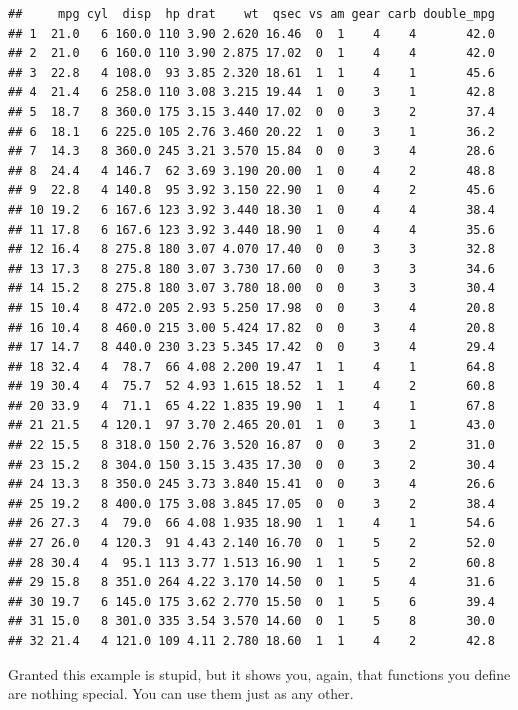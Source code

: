 \documentclass[]{gitbook}
\begin{document}
\begin{verbatim}
##     mpg cyl  disp  hp drat    wt  qsec vs am gear carb double_mpg
## 1  21.0   6 160.0 110 3.90 2.620 16.46  0  1    4    4       42.0
## 2  21.0   6 160.0 110 3.90 2.875 17.02  0  1    4    4       42.0
## 3  22.8   4 108.0  93 3.85 2.320 18.61  1  1    4    1       45.6
## 4  21.4   6 258.0 110 3.08 3.215 19.44  1  0    3    1       42.8
## 5  18.7   8 360.0 175 3.15 3.440 17.02  0  0    3    2       37.4
## 6  18.1   6 225.0 105 2.76 3.460 20.22  1  0    3    1       36.2
## 7  14.3   8 360.0 245 3.21 3.570 15.84  0  0    3    4       28.6
## 8  24.4   4 146.7  62 3.69 3.190 20.00  1  0    4    2       48.8
## 9  22.8   4 140.8  95 3.92 3.150 22.90  1  0    4    2       45.6
## 10 19.2   6 167.6 123 3.92 3.440 18.30  1  0    4    4       38.4
## 11 17.8   6 167.6 123 3.92 3.440 18.90  1  0    4    4       35.6
## 12 16.4   8 275.8 180 3.07 4.070 17.40  0  0    3    3       32.8
## 13 17.3   8 275.8 180 3.07 3.730 17.60  0  0    3    3       34.6
## 14 15.2   8 275.8 180 3.07 3.780 18.00  0  0    3    3       30.4
## 15 10.4   8 472.0 205 2.93 5.250 17.98  0  0    3    4       20.8
## 16 10.4   8 460.0 215 3.00 5.424 17.82  0  0    3    4       20.8
## 17 14.7   8 440.0 230 3.23 5.345 17.42  0  0    3    4       29.4
## 18 32.4   4  78.7  66 4.08 2.200 19.47  1  1    4    1       64.8
## 19 30.4   4  75.7  52 4.93 1.615 18.52  1  1    4    2       60.8
## 20 33.9   4  71.1  65 4.22 1.835 19.90  1  1    4    1       67.8
## 21 21.5   4 120.1  97 3.70 2.465 20.01  1  0    3    1       43.0
## 22 15.5   8 318.0 150 2.76 3.520 16.87  0  0    3    2       31.0
## 23 15.2   8 304.0 150 3.15 3.435 17.30  0  0    3    2       30.4
## 24 13.3   8 350.0 245 3.73 3.840 15.41  0  0    3    4       26.6
## 25 19.2   8 400.0 175 3.08 3.845 17.05  0  0    3    2       38.4
## 26 27.3   4  79.0  66 4.08 1.935 18.90  1  1    4    1       54.6
## 27 26.0   4 120.3  91 4.43 2.140 16.70  0  1    5    2       52.0
## 28 30.4   4  95.1 113 3.77 1.513 16.90  1  1    5    2       60.8
## 29 15.8   8 351.0 264 4.22 3.170 14.50  0  1    5    4       31.6
## 30 19.7   6 145.0 175 3.62 2.770 15.50  0  1    5    6       39.4
## 31 15.0   8 301.0 335 3.54 3.570 14.60  0  1    5    8       30.0
## 32 21.4   4 121.0 109 4.11 2.780 18.60  1  1    4    2       42.8
\end{verbatim}

Granted this example is stupid, but it shows you, again, that functions you define are nothing
special. You can use them just as any other.
\end{document}
